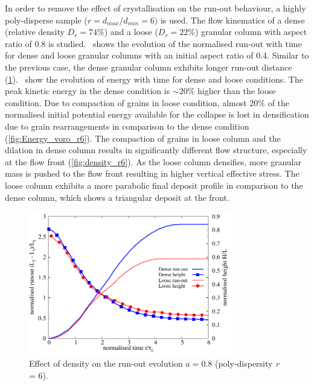 In order to remove the effect of crystallisation on the run-out behaviour, a 
highly poly-disperse sample ($r = d_{max}/d_{min} = 6)$ is used. 
The flow kinematics of a dense (relative density $D_r = 74\%$) and a loose 
($D_r = 22\%$) granular column with aspect ratio of 0.8 is 
studied.~ shows the evolution of the 
normalised run-out with time for dense and loose granular columns with an 
initial aspect ratio of 0.4. Similar to 
the previous case, the dense granular column exhibits longer run-out distance 
(\cref{fig:runout_height_dense_r6}).~ show the 
evolution of energy with time for dense and loose conditions. The peak kinetic 
energy in the dense condition is $\sim 20\%$ higher than the loose 
condition. Due to compaction of grains in loose condition, almost 20\% of the 
normalised initial potential energy available for the collapse is lost in 
densification due to grain rearrangements in comparison to the dense 
condition (\cref{fig:Energy_voro_r6}). The compaction of grains in loose 
column and the dilation in dense column results in significantly different flow 
structure, especially at the flow front (\cref{fig:density_r6}). As the loose 
column densifies, more granular mass is pushed to the flow front resulting in 
higher vertical effective stress. The loose column exhibits a more parabolic 
final deposit profile in comparison to the dense column, which shows a 
triangular deposit at the front.

\begin{figure}[tbhp]
\centering
\includegraphics[width=0.8\textwidth]{runout_height_dense_r6}
\caption{Effect of density on the run-out evolution $a = 0.8$ (poly-dispersity 
\textit{r} = 6).}
\label{fig:runout_height_dense_r6}
\end{figure}


